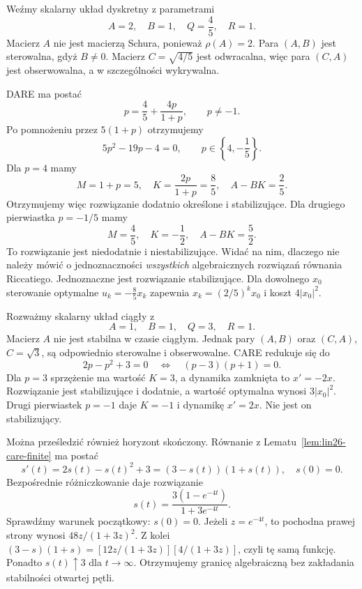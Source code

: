 \begin{przyklad}
\label{prz:lin26-unstable-dare}
Weźmy skalarny układ
dyskretny z parametrami
\[
 A=2,\quad B=1,\quad
 Q=\frac45,\quad R=1.
\]
Macierz \(A\) nie jest
macierzą Schura,
ponieważ \(\rho(A)=2\).
Para \((A,B)\)
jest sterowalna, gdyż \(B\ne0\).
Macierz \(C=\sqrt{4/5}\)
jest odwracalna,
więc para \((C,A)\)
jest obserwowalna,
a w szczególności wykrywalna.

DARE ma postać
\[
 p=\frac45+\frac{4p}{1+p},
 \qquad p\ne-1.
\]
Po pomnożeniu przez \(5(1+p)\)
otrzymujemy
\[
 5p^2-19p-4=0,
 \qquad
 p\in\left\{4,-\frac15\right\}.
\]
Dla \(p=4\) mamy
\[
 M=1+p=5,\quad
 K=\frac{2p}{1+p}=\frac85,\quad
 A-BK=\frac25.
\]
Otrzymujemy więc
rozwiązanie dodatnio określone
i stabilizujące.
Dla drugiego pierwiastka
\(p=-1/5\) mamy
\[
 M=\frac45,\quad
 K=-\frac12,\quad
 A-BK=\frac52.
\]
To rozwiązanie jest
niedodatnie i niestabilizujące.
Widać na nim, dlaczego
nie należy mówić
o jednoznaczności
\emph{wszystkich}
algebraicznych rozwiązań
równania Riccatiego.
Jednoznaczne jest rozwiązanie
stabilizujące.
Dla dowolnego \(x_0\)
sterowanie optymalne
\(u_k=-\frac85x_k\)
zapewnia
\(x_k=(2/5)^kx_0\)
i koszt \(4|x_0|^2\).
\end{przyklad}

\begin{przyklad}
\label{prz:lin26-unstable-care}
Rozważmy skalarny układ
ciągły z
\[
 A=1,\quad B=1,\quad
 Q=3,\quad R=1.
\]
Macierz \(A\)
nie jest stabilna
w czasie ciągłym.
Jednak pary \((A,B)\)
oraz \((C,A)\), \(C=\sqrt3\),
są odpowiednio sterowalne
i obserwowalne.
CARE redukuje się do
\[
 2p-p^2+3=0
 \quad\Longleftrightarrow\quad
 (p-3)(p+1)=0.
\]
Dla \(p=3\)
sprzężenie ma wartość
\(K=3\),
a dynamika zamknięta to
\(x'=-2x\).
Rozwiązanie jest
stabilizujące i dodatnie,
a wartość optymalna
wynosi \(3|x_0|^2\).
Drugi pierwiastek \(p=-1\)
daje \(K=-1\)
i dynamikę \(x'=2x\).
Nie jest on stabilizujący.

Można prześledzić
również horyzont skończony.
Równanie z
Lematu~\ref{lem:lin26-care-finite}
ma postać
\[
 s'(t)=2s(t)-s(t)^2+3
       =(3-s(t))(1+s(t)),
 \quad s(0)=0.
\]
Bezpośrednie różniczkowanie
daje rozwiązanie
\[
 s(t)=\frac{3(1-e^{-4t})}
            {1+3e^{-4t}}.
\]
Sprawdźmy warunek początkowy:
\(s(0)=0\).
Jeżeli \(z=e^{-4t}\),
to pochodna prawej strony
wynosi
\(48z/(1+3z)^2\).
Z kolei
\((3-s)(1+s)
 =[12z/(1+3z)]
  [4/(1+3z)]\),
czyli tę samą funkcję.
Ponadto \(s(t)\uparrow3\)
dla \(t\to\infty\).
Otrzymujemy granicę
algebraiczną bez
zakładania stabilności
otwartej pętli.
\end{przyklad}

